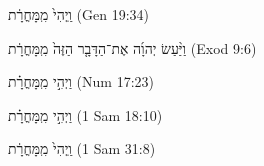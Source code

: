 
\begin{exe}

\ex\label{post_MXRT_exs1}
\texthebrew{
וַֽיְהִי֙ מִֽמָּחֳרָ֔ת 
} (Gen 19:34)

\ex\label{post_MXRT_exs2}
\texthebrew{
וַיַּ֨עַשׂ יְהוָ֜ה אֶת־הַדָּבָ֤ר הַזֶּה֙ מִֽמָּחֳרָ֔ת 
} (Exod 9:6)

\ex\label{post_MXRT_exs3}
\texthebrew{
וַיְהִ֣י מִֽמָּחֳרָ֗ת 
} (Num 17:23)

\ex\label{post_MXRT_exs4}
\texthebrew{
וַיְהִ֣י מִֽמָּחֳרָ֗ת 
} (1 Sam 18:10)

\ex\label{post_MXRT_exs5}
\texthebrew{
וַֽיְהִי֙ מִֽמָּחֳרָ֔ת 
} (1 Sam 31:8)

\end{exe}
